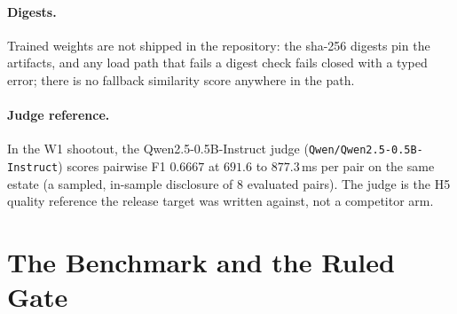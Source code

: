 \documentclass{article}
\begin{document}
\paragraph{Digests.}
Trained weights are not shipped in the repository: the sha-256 digests pin the artifacts, and any load path that fails a digest check fails closed with a typed error; there is no fallback similarity score anywhere in the path.

\begin{table}[t]
\caption{Shipped artifacts (traces: \texttt{results/weft-export-latency.json}, \texttt{RELEASE-MANIFEST.json}). Holdout is the $2{,}000$-pair v4 live set; runtime is the onnxruntime re-score on the $200$-pair sample on the verification box, so latency travels with the measurement, not with the artifact.}
\label{tab:artifacts}
\vskip 0.08in
\begin{center}
\end{center}
\vskip -0.14in
\end{table}

\paragraph{Judge reference.}
In the W1 shootout, the Qwen2.5-0.5B-Instruct judge (\texttt{Qwen/Qwen2.5-0.5B-Instruct}) scores pairwise F1 $0.6667$ at $691.6$ to $877.3$\,ms per pair on the same estate (a sampled, in-sample disclosure of $8$ evaluated pairs). The judge is the H5 quality reference the release target was written against, not a competitor arm.

\section{The Benchmark and the Ruled Gate}
\label{sec:benchmark}
\end{document}
